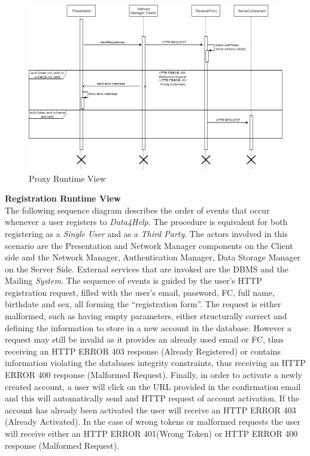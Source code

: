 \documentclass[titlepage]{article}
\begin{document}
\begin{figure}[H]
	\center
  	\includegraphics[width=13cm]{Proxy.png}
  	\caption{Proxy Runtime View}
 	\label{fig:PROXY}
\end{figure}
\noindent
{\bf Registration Runtime View }\\ 
The following sequence diagram describes the order of events that occur whenever a user registers to {\it Data4Help}. The procedure is equivalent for both registering as a {\it Single User} and as a {\it Third Party}. The actors involved in this scenario are the Presentation and Network Manager components on the Client side and the Network Manager, Authentication Manager, Data Storage Manager on the Server Side. External services that are invoked are the DBMS and the Mailing {\it System}.
The sequence of events is guided by the user’s HTTP registration request, filled with the user’s email, password, FC, full name, birthdate and sex, all forming the “registration form”. The request is either malformed, such as having empty parameters, either structurally correct and defining the information to store in a new account in the database. However a request may still be invalid as it provides an already used email or FC, thus receiving an HTTP ERROR 403 response (Already Registered) or contains information violating the databases integrity constraints, thus receiving an HTTP ERROR 400 response (Malformed Request).
Finally, in order to activate a newly created account, a user will click on the URL provided in the confirmation email and this will automatically send and HTTP request of account activation. If the account has already been activated the user will receive an HTTP ERROR 403 (Already Activated). In the case of wrong tokens or malformed requests the user will receive either an HTTP ERROR 401(Wrong Token) or HTTP ERROR 400 response (Malformed Request).
\end{document}
